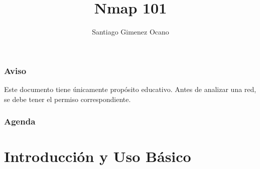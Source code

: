 \documentclass[aspectratio=169]{beamer}
\title{Nmap 101}
\author{Santiago Gimenez Ocano}
\date{}
\begin{document}
\begin{frame}
    \begin{block}{}
        \titlepage
    \end{block}
\end{frame}

\begin{frame}
    \frametitle{Aviso}
    \begin{block}{}
        \begin{center}
            Este documento tiene \'unicamente prop\'osito educativo. Antes de analizar una red, se debe tener el permiso correspondiente.
        \end{center}
    \end{block}   
\end{frame}

\begin{frame}
    \frametitle{Agenda}
    \tableofcontents
\end{frame}

\section{Introducci\'on y Uso B\'asico}
\end{document}
